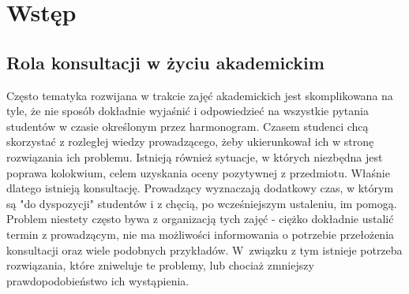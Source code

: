 \chapter{Wstęp}
\section{Rola konsultacji w życiu akademickim}
Często tematyka rozwijana w trakcie zajęć akademickich jest skomplikowana na tyle, że nie sposób dokładnie wyjaśnić i odpowiedzieć na wszystkie pytania studentów w czasie określonym przez harmonogram. Czasem studenci chcą skorzystać z rozległej wiedzy prowadzącego, żeby ukierunkował ich w stronę rozwiązania ich problemu. Istnieją również sytuacje, w których niezbędna jest poprawa kolokwium, celem uzyskania oceny pozytywnej z przedmiotu. Właśnie dlatego istnieją konsultację. Prowadzący wyznaczają dodatkowy czas, w którym są "do dyspozycji" studentów i z chęcią, po wcześniejszym ustaleniu, im pomogą. Problem niestety często bywa z organizacją tych zajęć - ciężko dokładnie ustalić termin z prowadzącym, nie ma możliwości informowania o potrzebie przełożenia konsultacji oraz wiele podobnych przykładów. W~związku z tym istnieje potrzeba rozwiązania, które zniweluje te problemy, lub chociaż zmniejszy prawdopodobieństwo ich wystąpienia.
